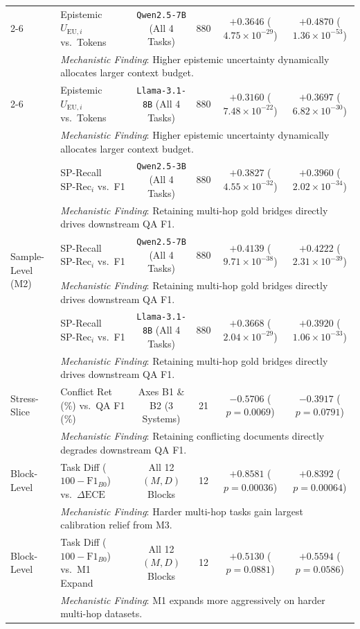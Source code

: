 \documentclass[11pt]{article}
\begin{document}
\begin{table}[t]
{\begin{tabular}{llcccc}
\cmidrule(lr){2-6}
 & Epistemic $U_{\text{EU}, i}$ vs.\ Tokens & \texttt{Qwen2.5-7B} (All 4 Tasks) & 880 & $\mathbf{+0.3646}$ ($4.75 \times 10^{-29}$) & $\mathbf{+0.4870}$ ($1.36 \times 10^{-53}$) \\
& \multicolumn{5}{l}{\quad\textit{Mechanistic Finding}: Higher epistemic uncertainty dynamically allocates larger context budget.} \\
\cmidrule(lr){2-6}
 & Epistemic $U_{\text{EU}, i}$ vs.\ Tokens & \texttt{Llama-3.1-8B} (All 4 Tasks) & 880 & $\mathbf{+0.3160}$ ($7.48 \times 10^{-22}$) & $\mathbf{+0.3697}$ ($6.82 \times 10^{-30}$) \\
& \multicolumn{5}{l}{\quad\textit{Mechanistic Finding}: Higher epistemic uncertainty dynamically allocates larger context budget.} \\
\midrule
\multirow{6}{*}{Sample-Level (M2)} & SP-Recall $\text{SP-Rec}_i$ vs.\ F1 & \texttt{Qwen2.5-3B} (All 4 Tasks) & 880 & $\mathbf{+0.3827}$ ($4.55 \times 10^{-32}$) & $\mathbf{+0.3960}$ ($2.02 \times 10^{-34}$) \\
& \multicolumn{5}{l}{\quad\textit{Mechanistic Finding}: Retaining multi-hop gold bridges directly drives downstream QA F1.} \\
\cmidrule(lr){2-6}
 & SP-Recall $\text{SP-Rec}_i$ vs.\ F1 & \texttt{Qwen2.5-7B} (All 4 Tasks) & 880 & $\mathbf{+0.4139}$ ($9.71 \times 10^{-38}$) & $\mathbf{+0.4222}$ ($2.31 \times 10^{-39}$) \\
& \multicolumn{5}{l}{\quad\textit{Mechanistic Finding}: Retaining multi-hop gold bridges directly drives downstream QA F1.} \\
\cmidrule(lr){2-6}
 & SP-Recall $\text{SP-Rec}_i$ vs.\ F1 & \texttt{Llama-3.1-8B} (All 4 Tasks) & 880 & $\mathbf{+0.3668}$ ($2.04 \times 10^{-29}$) & $\mathbf{+0.3920}$ ($1.06 \times 10^{-33}$) \\
& \multicolumn{5}{l}{\quad\textit{Mechanistic Finding}: Retaining multi-hop gold bridges directly drives downstream QA F1.} \\
\midrule
Stress-Slice & Conflict Ret (\%) vs.\ QA F1 (\%) & Axes B1 \& B2 (3 Systems) & 21 & $\mathbf{-0.5706}$ ($p = 0.0069$) & $-0.3917$ ($p = 0.0791$) \\
& \multicolumn{5}{l}{\quad\textit{Mechanistic Finding}: Retaining conflicting documents directly degrades downstream QA F1.} \\
\midrule
Block-Level & Task Diff ($100-\text{F1}_{B0}$) vs.\ $\Delta\text{ECE}$ & All 12 $(M, D)$ Blocks & 12 & $\mathbf{+0.8581}$ ($p = 0.00036$) & $\mathbf{+0.8392}$ ($p = 0.00064$) \\
& \multicolumn{5}{l}{\quad\textit{Mechanistic Finding}: Harder multi-hop tasks gain largest calibration relief from M3.} \\
\addlinespace[2pt]
Block-Level & Task Diff ($100-\text{F1}_{B0}$) vs.\ M1 Expand & All 12 $(M, D)$ Blocks & 12 & $+0.5130$ ($p = 0.0881$) & $+0.5594$ ($p = 0.0586$) \\
& \multicolumn{5}{l}{\quad\textit{Mechanistic Finding}: M1 expands more aggressively on harder multi-hop datasets.} \\
\bottomrule
\end{tabular}
}
\end{table}
\end{document}
